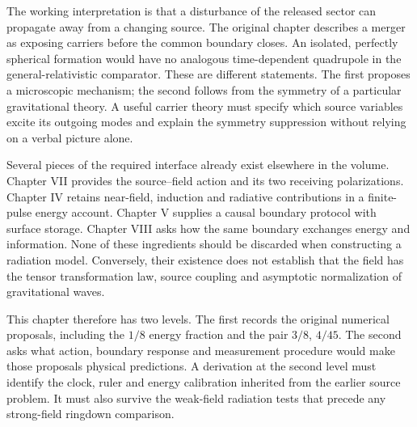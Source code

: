 The working interpretation is that a disturbance of the released sector can propagate away from a changing source. The original chapter describes a merger as exposing carriers before the common boundary closes. An isolated, perfectly spherical formation would have no analogous time-dependent quadrupole in the general-relativistic comparator. These are different statements. The first proposes a microscopic mechanism; the second follows from the symmetry of a particular gravitational theory. A useful carrier theory must specify which source variables excite its outgoing modes and explain the symmetry suppression without relying on a verbal picture alone.

Several pieces of the required interface already exist elsewhere in the volume. Chapter VII provides the source--field action and its two receiving polarizations. Chapter IV retains near-field, induction and radiative contributions in a finite-pulse energy account. Chapter V supplies a causal boundary protocol with surface storage. Chapter VIII asks how the same boundary exchanges energy and information. None of these ingredients should be discarded when constructing a radiation model. Conversely, their existence does not establish that the field has the tensor transformation law, source coupling and asymptotic normalization of gravitational waves.

This chapter therefore has two levels. The first records the original numerical proposals, including the $1/8$ energy fraction and the pair $3/8$, $4/45$. The second asks what action, boundary response and measurement procedure would make those proposals physical predictions. A derivation at the second level must identify the clock, ruler and energy calibration inherited from the earlier source problem. It must also survive the weak-field radiation tests that precede any strong-field ringdown comparison.

